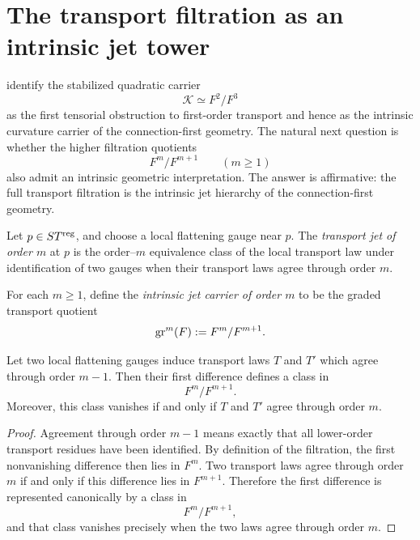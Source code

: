 \section{The transport filtration as an intrinsic jet tower}
\label{sec:jet-tower}
identify the stabilized quadratic carrier
\[
	\mathcal K \simeq F^2/F^3
\]
as the first tensorial obstruction to first-order transport and hence as
the intrinsic curvature carrier of the connection-first geometry.
The natural next question is whether the higher filtration quotients
\[
	F^m/F^{m+1}
	\qquad (m\ge 1)
\]
also admit an intrinsic geometric interpretation.
The answer is affirmative: the full transport filtration is the
intrinsic jet hierarchy of the connection-first geometry.
\begin{definition}
	Let \(p\in ST^{\mathrm{reg}}\), and choose a local flattening gauge near \(p\).
	The \emph{transport jet of order \(m\)} at \(p\) is the order--\(m\)
	equivalence class of the local transport law under identification of
	two gauges when their transport laws agree through order \(m\).
\end{definition}
\begin{definition}
	For each \(m\ge 1\), define the \emph{intrinsic jet carrier of order
		\(m\)} to be the graded transport quotient
	\[
		\operatorname{gr}^m(F):=F^m/F^{m+1}.
	\]
\end{definition}
\begin{lemma}
	\label{lem:order-filtration}
	Let two local flattening gauges induce transport laws \(T\) and \(T'\)
	which agree through order \(m-1\).  Then their first difference defines
	a class in
	\[
		F^m/F^{m+1}.
	\]
	Moreover, this class vanishes if and only if \(T\) and \(T'\) agree
	through order \(m\).
\end{lemma}
\begin{proof}
	Agreement through order \(m-1\) means exactly that all lower-order
	transport residues have been identified.  By definition of the
	filtration, the first nonvanishing difference then lies in \(F^m\).  Two
	transport laws agree through order \(m\) if and only if this difference
	lies in \(F^{m+1}\).  Therefore the first difference is represented
	canonically by a class in
	\[
		F^m/F^{m+1},
	\]
	and that class vanishes precisely when the two laws agree through order
	\(m\).
\end{proof}
